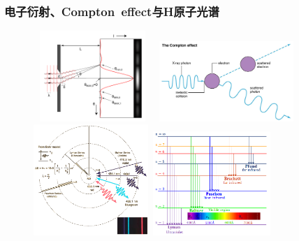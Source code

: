{\frame
{
	\frametitle{电子衍射、\textrm{Compton~effect}与\textrm{H}原子光谱}
\begin{figure}[h!]
\centering
\vspace{-15.5pt}
\includegraphics[height=1.35in,width=1.80in,viewport=0 0 680 600,clip]{Figures/Single_Slit_Diffraction.png}
\includegraphics[height=1.20in,width=2.10in,viewport=0 0 1600 950,clip]{Figures/Compton_effect.jpg}\\
\includegraphics[height=1.65in,width=1.75in,viewport=0 0 620 600,clip]{Figures/Hydrogen_spectrum-3.png}
\includegraphics[height=1.55in,width=1.75in,viewport=0 0 500 380,clip]{Figures/Hydrogen_spectrum-2.png}
\label{electron:wave_and_particle}
\end{figure}
}

}
